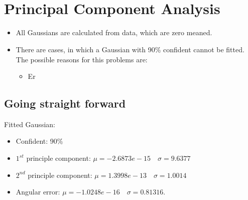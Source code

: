 \documentclass[paper=a4, fontsize=11pt]{scrartcl} %
\title{\hmwkClass \\
       \hmwkTitle}
\author{\hmwkAuthorFullName}
\date{\hmwkDueDate}
\begin{document}
    \maketitle
    \thispagestyle{fancy} %
    
    \section{Principal Component Analysis}
    \begin{itemize}
    	\item All Gaussians are calculated from data, which are zero meaned.
        \item There are cases, in which a Gaussian with 90\% confident cannot be fitted. The possible reasons for this problems are:
        \begin{itemize}
        	\item Er 
        \end{itemize}

    \end{itemize}

    \subsection{Going straight forward}
    Fitted Gaussian:
    \begin{itemize}
    	\item Confident: 90\%
	    \item $1^{st}$ principle component: $\mu = -2.6873e-15 \quad \sigma = 9.6377$
	    \item $2^{nd}$ principle component: $\mu = 1.3998e-13 \quad \sigma = 1.0014$
	    \item Angular error: $\mu = -1.0248e-16 \quad \sigma = 0.81316$.
    \end{itemize}
    
\end{document}

